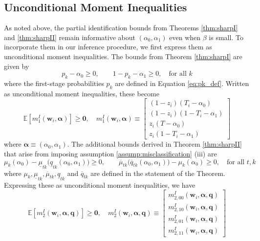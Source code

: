 \subsection{Unconditional Moment Inequalities}
As noted above, the partial identification bounds from Theorems \ref{thm:sharpI} and \ref{thm:sharpII} remain informative about $(\alpha_0, \alpha_1)$ even when $\beta$ is small.
To incorporate them in our inference procedure, we first express them as unconditional moment inequalities.
The bounds from Theorem \ref{thm:sharpI} are given by
\begin{equation*}
  p_k - \alpha_0 \geq 0, \quad \quad 1 - p_k - \alpha_1 \geq 0, \quad \mbox{for all } k 
\end{equation*}
where the first-stage probabilities $p_k$ are defined in Equation \ref{eq:pk_def}.
Written as unconditional moment inequalities, these become
\begin{equation}
  \mathbb{E}\left[ m_1^I(\mathbf{w}_i,\boldsymbol{\alpha} ) \right] \geq \mathbf{0},  \quad
m_1^I(\mathbf{w}_i, \boldsymbol{\alpha}) \equiv \left[
  \begin{array}{l}
    (1 - z_i)(T_i - \alpha_0) \\
    (1 - z_i)(1 - T_i - \alpha_1) \\
    z_i(T - \alpha_0) \\
    z_i (1 - T_i - \alpha_1) 
  \end{array}
\right]
\end{equation}
where $\boldsymbol{\alpha} \equiv (\alpha_0, \alpha_1)$.
The additional bounds derived in Theorem \ref{thm:sharpII} that arise from imposing assumption \ref{assump:misclassification} (iii) are
\begin{equation*}
  \mu_k(\alpha_0) - \underline{\mu}_{tk}\big( \underline{q}_{tk}(\alpha_0, \alpha_1) \big) \geq 0, \quad \quad
  \overline{\mu}_{tk}\big( \overline{q}_{tk}(\alpha_0, \alpha_1) \big) - \mu_k(\alpha_0) \geq 0, \quad \mbox{for all } t,k
\end{equation*}
where $\mu_k, \underline{\mu}_{tk}, \overline{\mu}_{tk}, \underline{q}_{tk}$ and $\overline{q}_{tk}$ are defined in the statement of the Theorem.
Expressing these as unconditional moment inequalities, we have
\begin{equation}
  \mathbb{E}[m_2^I(\mathbf{w}_i,\boldsymbol{\alpha}, \mathbf{q})] \geq \mathbf{0}, \quad 
  m_2^I(\mathbf{w}_i,\boldsymbol{\alpha}, \mathbf{q}) \equiv \left[
  \begin{array}{c}
    m_{2,00}^I(\mathbf{w}_i,\boldsymbol{\alpha}, \mathbf{q})  \\ 
    m_{2,10}^I(\mathbf{w}_i,\boldsymbol{\alpha}, \mathbf{q}) \\
    m_{2,01}^I(\mathbf{w}_i,\boldsymbol{\alpha}, \mathbf{q})  \\ 
    m_{2,11}^I(\mathbf{w}_i,\boldsymbol{\alpha}, \mathbf{q}) 
  \end{array}
\right] 
\end{equation}
